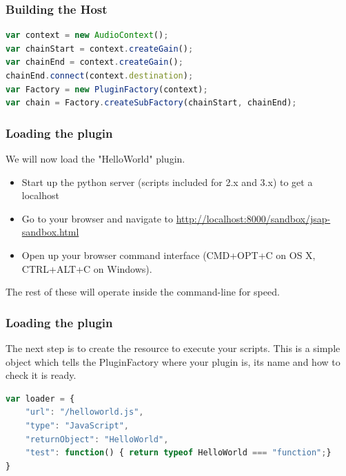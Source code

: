 \documentclass{beamer}
\begin{document}
\begin{frame}[fragile]
\frametitle{Building the Host}
\begin{lstlisting}[language=javascript]
var context = new AudioContext();
var chainStart = context.createGain();
var chainEnd = context.createGain();
chainEnd.connect(context.destination);
var Factory = new PluginFactory(context);
var chain = Factory.createSubFactory(chainStart, chainEnd);
\end{lstlisting}
\end{frame}

\begin{frame}
\frametitle{Loading the plugin}
We will now load the "HelloWorld" plugin.\\
\begin{itemize}
\item Start up the python server (scripts included for 2.x and 3.x) to get a localhost
\item Go to your browser and navigate to \url{http://localhost:8000/sandbox/jsap-sandbox.html}
\item Open up your browser command interface (CMD+OPT+C on OS X, CTRL+ALT+C on Windows).
\end{itemize}
The rest of these will operate inside the command-line for speed.
\end{frame}


\begin{frame}[fragile]
\frametitle{Loading the plugin}
The next step is to create the resource to execute your scripts. This is a simple object which tells the PluginFactory where your plugin is, its name and how to check it is ready.
\begin{lstlisting}[language=javascript]
var loader = {
    "url": "/helloworld.js",
    "type": "JavaScript",
    "returnObject": "HelloWorld",
    "test": function() { return typeof HelloWorld === "function";}
}
\end{lstlisting}
\end{frame}
\end{document}
